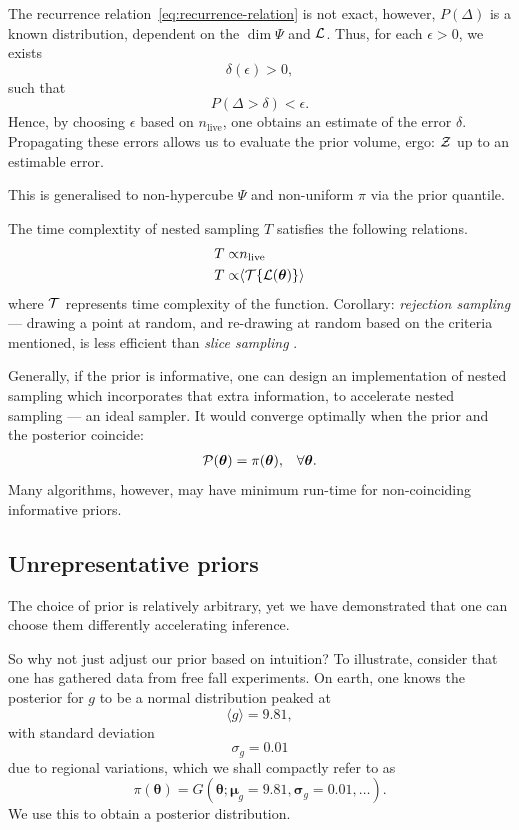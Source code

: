 \documentclass[usenatbib]{mnras}
\begin{document}
The recurrence relation~\eqref{eq:recurrence-relation} is not exact,
however, \(P(\Delta)\) is a known distribution, dependent on the
\(\dim \Psi\) and \({\cal L}\). Thus, for each \(\epsilon>0\), we
exists
\[\delta(\epsilon) >0,\] such that \[P(\Delta > \delta)<\epsilon.\]
Hence, by choosing \(\epsilon\) based on \(n_\text{live}\), one
obtains an estimate of the error \(\delta\). Propagating these errors
allows us to evaluate the prior volume, ergo: ${\cal Z}$ up to an
estimable error.

This is generalised to non-hypercube $\Psi$ and non-uniform $\pi$ via
the prior quantile. 

The time complextity of nested sampling $T$ satisfies the following
relations.
\begin{subequations}\label{eq:complexity}
  \begin{align}
    T \propto & n_\text{live}\\
    T \propto & \langle {\cal T}\{{\cal L}(\bm{\theta})\} \rangle
  \end{align}
\end{subequations}
where ${\cal T}$ represents time complexity of the
function. Corollary: \emph{rejection sampling} --- drawing a point at random,
and re-drawing at random based on the criteria mentioned, is less
efficient than \emph{slice sampling} \citep{Neal_2003}.

Generally, if the prior is informative, one can design an
implementation of nested sampling which incorporates that extra
information, to accelerate nested sampling --- an ideal sampler. It
would converge optimally when the prior and the posterior coincide:
\begin{equation}
\begin{array}{rl} 
{\cal P}(\bm{\theta}) = \pi(\bm{\theta}), & \forall \bm{\theta}. 
\end{array}
\end{equation}
Many algorithms, however, may have minimum run-time for non-coinciding
informative priors.

\subsection{Unrepresentative priors\label{discussion-bias}}
The choice of prior is relatively arbitrary, yet we have
demonstrated that one can choose them differently accelerating
inference.

So why not just adjust our prior based on intuition?  To illustrate,
consider that one has gathered data from free fall experiments. On
earth, one knows the posterior for \(g\) to be a normal distribution
peaked at \[\langle g \rangle=9.81,\] with standard
deviation \[\sigma_{g} = 0.01\] due to regional variations, which we
shall compactly refer to as
\begin{equation*}
  \pi(\bm{\theta}) = G(\bm{\theta};\bm{\mu}_{g}=9.81, \bm{\sigma}_{g}=0.01, \ldots ).
\end{equation*}
We use this to obtain a posterior distribution.
\end{document}

